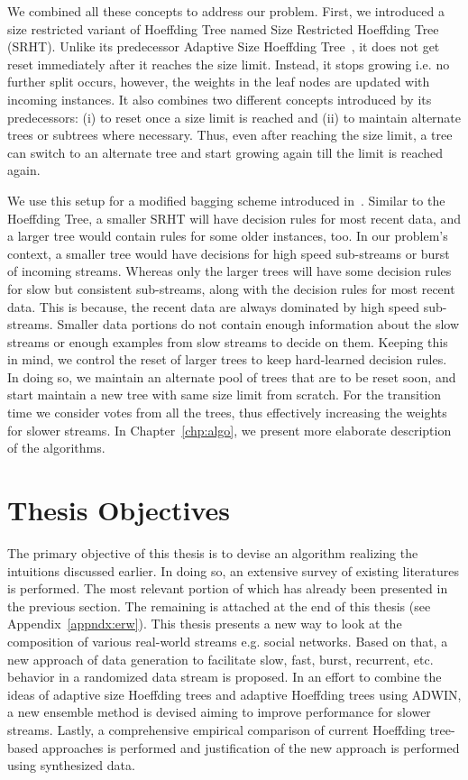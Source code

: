 We combined all these concepts to address our problem. First, we introduced a size restricted variant of Hoeffding Tree named Size Restricted Hoeffding Tree (SRHT). Unlike its predecessor Adaptive Size Hoeffding Tree~\cite{bifet09:asht}, it does not get reset immediately after it reaches the size limit. Instead, it stops growing i.e. no further split occurs, however, the weights in the leaf nodes are updated with incoming instances. It also combines two different concepts introduced by its predecessors: (i) to reset once a size limit is reached and (ii) to maintain alternate trees or subtrees where necessary. Thus, even after reaching the size limit, a tree can switch to an alternate tree and start growing again till the limit is reached again. 

We use this setup for a modified bagging scheme introduced in~\cite{bifet09:asht}. Similar to the Hoeffding Tree, a smaller SRHT will have decision rules for most recent data, and a larger tree would contain rules for some older instances, too. In our problem's context, a smaller tree would have decisions for high speed sub-streams or burst of incoming streams. Whereas only the larger trees will have some decision rules for slow but consistent sub-streams, along with the decision rules for most recent data. This is because, the recent data are always dominated by high speed sub-streams. Smaller data portions do not contain enough information about the slow streams or enough examples from slow streams to decide on them. Keeping this in mind, we control the reset of larger trees to keep hard-learned decision rules. In doing so, we maintain an alternate pool of trees that are to be reset soon, and start maintain a new tree with same size limit from scratch. For the transition time we consider votes from all the trees, thus effectively increasing the weights for slower streams. In Chapter~\ref{chp:algo}, we present more elaborate description of the algorithms.



\section{Thesis Objectives}
The primary objective of this thesis is to devise an algorithm realizing the intuitions discussed earlier. In doing so, an extensive survey of existing literatures is performed. The most relevant portion of which has already been presented in the previous section. The remaining is attached at the end of this thesis (see Appendix~\ref{appndx:erw}). This thesis presents a new way to look at the composition of various real-world streams e.g. social networks. Based on that, a new approach of data generation to facilitate slow, fast, burst, recurrent, etc. behavior in a randomized data stream is proposed. In an effort to combine the ideas of adaptive size Hoeffding trees and adaptive Hoeffding trees using ADWIN, a new ensemble method is devised aiming to improve performance for slower streams. Lastly, a comprehensive empirical comparison of current Hoeffding tree-based approaches is performed and justification of the new approach is performed using synthesized data.



